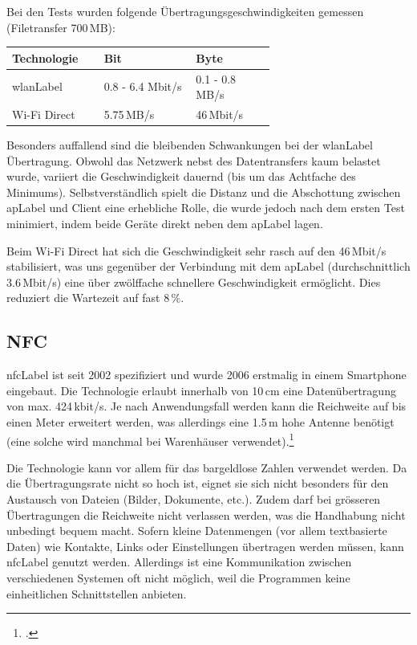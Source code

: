 Bei den Tests wurden folgende Übertragungsgeschwindigkeiten gemessen (Filetransfer 700\,MB):
\begin{table}[H]
	\small\sffamily\renewcommand{\arraystretch}{1.4}
	\begin{tabular}{lp{0.35\linewidth}p{0.30\linewidth}}
		\toprule
		Technologie & Bit & Byte\\
		\midrule
		\gls{wlanLabel} & 0.8 - 6.4 Mbit/s & 0.1 - 0.8\,MB/s\\
		Wi-Fi Direct & 5.75\,MB/s & 46\,Mbit/s\\
		\bottomrule
	\end{tabular}
\end{table}

Besonders auffallend sind die bleibenden Schwankungen bei der \gls{wlanLabel} Übertragung.
Obwohl das Netzwerk nebst des Datentransfers kaum belastet wurde, variiert die Geschwindigkeit dauernd (bis um das Achtfache des Minimums).
Selbstverständlich spielt die Distanz und die Abschottung zwischen \gls{apLabel} und Client eine erhebliche Rolle, die wurde jedoch nach dem ersten Test minimiert, indem beide Geräte direkt neben dem \gls{apLabel} lagen.

Beim Wi-Fi Direct hat sich die Geschwindigkeit sehr rasch auf den 46\,Mbit/s stabilisiert, was uns gegenüber der Verbindung mit dem \gls{apLabel} (durchschnittlich 3.6\,Mbit/s) eine über zwölffache schnellere Geschwindigkeit ermöglicht.
Dies reduziert die Wartezeit auf fast 8\,\%.

\subsection{NFC}
\gls{nfcLabel} ist seit 2002 spezifiziert und wurde 2006 erstmalig in einem Smartphone eingebaut.
Die Technologie erlaubt innerhalb von 10\,cm eine Datenübertragung von max. 424\,kbit/s. Je nach Anwendungsfall werden kann die Reichweite auf bis einen Meter erweitert werden, was allerdings eine 1.5\,m hohe Antenne benötigt (eine solche wird manchmal bei Warenhäuser verwendet).\footcite{Near_Field_Communication_Wikipedia_2015-05-22}

Die Technologie kann vor allem für das bargeldlose Zahlen verwendet werden.
Da die Übertragungsrate nicht so hoch ist, eignet sie sich nicht besonders für den Austausch von Dateien (Bilder, Dokumente, etc.).
Zudem darf bei grösseren Übertragungen die Reichweite nicht verlassen werden, was die Handhabung nicht unbedingt bequem macht.
Sofern kleine Datenmengen (vor allem textbasierte Daten) wie Kontakte, Links oder Einstellungen übertragen werden müssen, kann \gls{nfcLabel} genutzt werden. Allerdings ist eine Kommunikation zwischen verschiedenen Systemen oft nicht möglich, weil die Programmen keine einheitlichen Schnittstellen anbieten.

